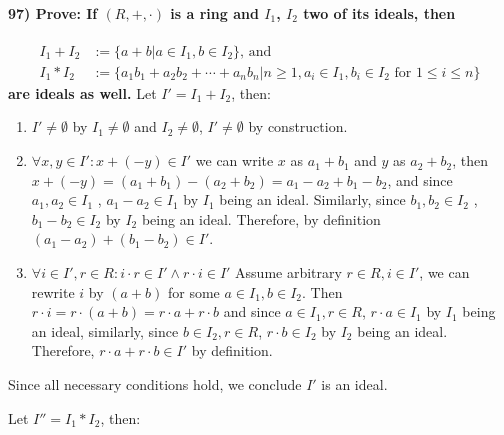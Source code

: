 \documentclass[
]{article}
\begin{document}
\hypertarget{prove-if-rcdot-is-a-ring-and-i_1-i_2-two-of-its-ideals-then}{%
\paragraph{\texorpdfstring{97) Prove: If \((R,+,\cdot)\) is a ring and
\(I_1\), \(I_2\) two of its ideals,
then}{97) Prove: If (R,+,\textbackslash cdot) is a ring and I\_1, I\_2 two of its ideals, then}}\label{prove-if-rcdot-is-a-ring-and-i_1-i_2-two-of-its-ideals-then}}

\[
\begin{aligned}
I_1 + I_2 &:= \{a+b| a \in I_1, b \in I_2\} \text{, and} \\
I_1 * I_2 &:= \{a_1 b_1 + a_2 b_2 + \cdots + a_n b_n | n \geq 1, a_i \in I_1, b_i \in I_2 \text{ for } 1 \leq i \leq n\}
\end{aligned}
\] \textbf{are ideals as well.} Let \(I' = I_1 + I_2\), then:

\begin{enumerate}
\def\labelenumi{\arabic{enumi})}
\item
  \(I' \neq \emptyset\) by \(I_1 \neq \emptyset\) and
  \(I_2 \neq \emptyset\), \(I' \neq \emptyset\) by construction.
\item
  \(\forall x,y \in I': x + (-y) \in I'\) we can write \(x\) as
  \(a_1+b_1\) and \(y\) as \(a_2 + b_2\), then
  \(x + (-y) = (a_1+b_1) - (a_2 + b_2) = a_1 -a_2 + b_1 - b_2\), and
  since \(a_1,a_2 \in I_1\) , \(a_1 - a_2 \in I_1\) by \(I_1\) being an
  ideal. Similarly, since \(b_1,b_2 \in I_2\) , \(b_1 - b_2 \in I_2\) by
  \(I_2\) being an ideal. Therefore, by definition
  \((a_1 - a_2) + (b_1 - b_2) \in I'\).
\item
  \(\forall i \in I', r \in R: i \cdot r \in I' \land r \cdot i \in I'\)
  Assume arbitrary \(r \in R, i \in I'\), we can rewrite \(i\) by
  \((a+b)\) for some \(a \in I_1, b \in I_2\). Then
  \(r \cdot i = r \cdot (a+b) = r \cdot a + r \cdot b\) and since
  \(a \in I_1, r \in R\), \(r \cdot a \in I_1\) by \(I_1\) being an
  ideal, similarly, since \(b \in I_2, r \in R\), \(r \cdot b \in I_2\)
  by \(I_2\) being an ideal. Therefore, \(r \cdot a + r \cdot b \in I'\)
  by definition.
\end{enumerate}

Since all necessary conditions hold, we conclude \(I'\) is an ideal.

Let \(I'' = I_1 * I_2\), then:
\end{document}

